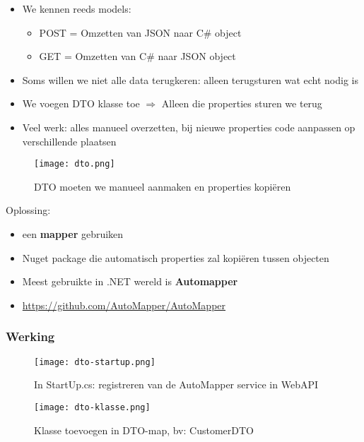 \documentclass{article}
\begin{document}
\begin{itemize}
    \item We kennen reeds models:
    \begin{itemize}
        \item POST = Omzetten van JSON naar C\# object 
        \item GET = Omzetten van C\# naar JSON object
    \end{itemize}
    \item Soms willen we niet alle data terugkeren: alleen terugsturen wat echt nodig is
    \item We voegen DTO klasse toe $\Rightarrow$ Alleen die properties sturen we terug
    \item Veel werk: alles manueel overzetten, bij nieuwe properties code aanpassen op verschillende plaatsen
\end{itemize}

\begin{figure}[H]
    \centering
    \texttt{[image: dto.png]}
    \caption{DTO moeten we manueel aanmaken en properties kopiëren}
\end{figure}

Oplossing:

\begin{itemize}
    \item een \textbf{mapper} gebruiken
    \item Nuget package die automatisch properties zal kopiëren tussen objecten
    \item Meest gebruikte in .NET wereld is \textbf{Automapper}
    \item \url{https://github.com/AutoMapper/AutoMapper}
\end{itemize}

\subsubsection{Werking}

\begin{figure}[H]
    \centering
    \texttt{[image: dto-startup.png]}
    \caption{In StartUp.cs: registreren van de AutoMapper service in WebAPI}
\end{figure}

\begin{figure}[H]
    \centering
    \texttt{[image: dto-klasse.png]}
    \caption{Klasse toevoegen in DTO-map, bv: CustomerDTO}
\end{figure}
\end{document}
